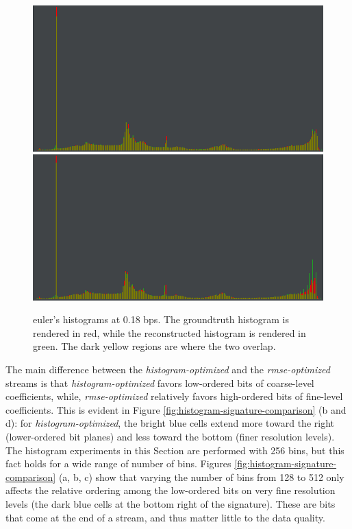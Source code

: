 \begin{figure}
	\centering
	{\includegraphics[width=0.48\linewidth]{img/histogram/histogram-signature.png}}
	{\includegraphics[width=0.48\linewidth]{img/histogram/histogram-by-wavelet-norm.png}}
	\caption{euler's histograms at 0.18 bps. The groundtruth histogram is rendered in red, while the
	reconstructed histogram is rendered in green. The dark yellow regions are where the two overlap.}
	\label{fig:histogram-comparison-low-bit-rate-slz}
\end{figure}

The main difference between the \emph{histogram-optimized} and the \emph{rmse-optimized} streams is
that \emph{histogram-optimized} favors low-ordered bits of coarse-level coefficients, while,
\emph{rmse-optimized} relatively favors high-ordered bits of fine-level coefficients. This is
evident in Figure \ref{fig:histogram-signature-comparison} (b and d): for
\emph{histogram-optimized}, the bright blue cells extend more toward the right (lower-ordered bit
planes) and less toward the bottom (finer resolution levels). The histogram experiments in this
Section are performed with 256 bins, but this fact holds for a wide range of number of bins. Figures
\ref{fig:histogram-signature-comparison} (a, b, c) show that varying the number of bins from 128 to
512 only affects the relative ordering among the low-ordered bits on very fine resolution levels
(the dark blue cells at the bottom right of the signature). These are bits that come at the end of a
stream, and thus matter little to the data quality. 
 
